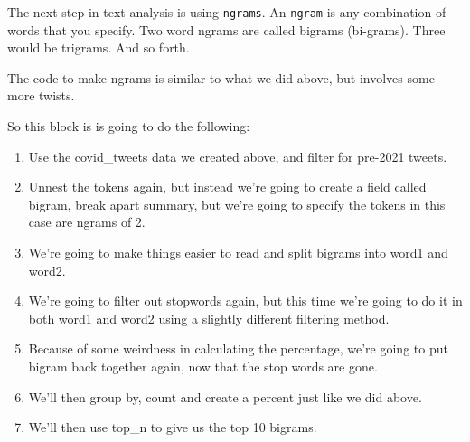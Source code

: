 \documentclass[
  letterpaper,
  DIV=11,
  numbers=noendperiod]{scrreprt}
\providecommand{\tightlist}{%
  \setlength{\itemsep}{0pt}\setlength{\parskip}{0pt}}\usepackage{longtable,booktabs,array}
\begin{document}
The next step in text analysis is using \texttt{ngrams}. An
\texttt{ngram} is any combination of words that you specify. Two word
ngrams are called bigrams (bi-grams). Three would be trigrams. And so
forth.

The code to make ngrams is similar to what we did above, but involves
some more twists.

So this block is is going to do the following:

\begin{enumerate}
\def\labelenumi{\arabic{enumi}.}
\tightlist
\item
  Use the covid\_tweets data we created above, and filter for pre-2021
  tweets.
\item
  Unnest the tokens again, but instead we're going to create a field
  called bigram, break apart summary, but we're going to specify the
  tokens in this case are ngrams of 2.
\item
  We're going to make things easier to read and split bigrams into word1
  and word2.
\item
  We're going to filter out stopwords again, but this time we're going
  to do it in both word1 and word2 using a slightly different filtering
  method.
\item
  Because of some weirdness in calculating the percentage, we're going
  to put bigram back together again, now that the stop words are gone.
\item
  We'll then group by, count and create a percent just like we did
  above.
\item
  We'll then use top\_n to give us the top 10 bigrams.
\end{enumerate}
\end{document}
